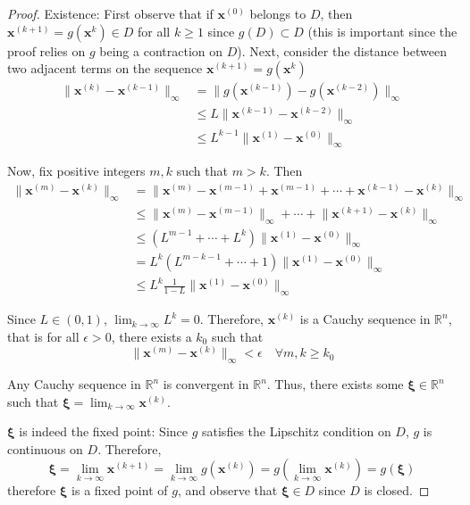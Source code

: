 \documentclass[12pt]{article}
\theoremstyle{definition}
\newcommand{\e}{\epsilon}
\newcommand{\R}{\mathbb{R}}
\newcommand{\norm}[1]{\lVert#1\rVert}
\newcommand{\x}{\bm{x}}
\newcommand{\xib}{\bm{\xi}}
\theoremstyle{definition}
\begin{document}
\begin{proof}
Existence: First observe that if $\x^{(0)}$ belongs to $D$, then $\x^{(k+1)} = g(\x^{k}) \in D$ for all $k \geq 1$ since $g(D) \subset D$ (this is important since the proof relies on $g$ being a contraction on $D$). Next, consider the distance between two adjacent terms on the sequence $\x^{(k+1)} = g(\x^{k})$
\begin{align*}
	\norm{\x^{(k)} - \x^{(k-1)}}_\infty &= \norm{g(\x^{(k-1)}) - g(\x^{(k-2)})}_\infty \tag{definition of $g$} \\
	&\leq L \norm{\x^{(k-1)} - \x^{(k-2)}}_\infty \tag{$g$ is a contraction on $D$} \\
	&\leq L^{k-1} \norm{\x^{(1)} - \x^{(0)}}_\infty \tag{induction}
\end{align*}

Now, fix positive integers $m,k$ such that $m > k$. Then
\begin{align*}
	\norm{\x^{(m)} - \x^{(k)}}_\infty &= \norm{\x^{(m)} - \x^{(m-1)} + \x^{(m-1)} + \cdots + \x^{(k-1)} - \x^{(k)}}_\infty \\
	&\leq \norm{\x^{(m)} - \x^{(m-1)}}_\infty + \cdots + \norm{\x^{(k+1)} - \x^{(k)}}_\infty \tag{triangle inequality} \\
	&\leq (L^{m-1} + \cdots + L^k) \norm{\x^{(1)} - \x^{(0)}}_\infty \tag{$g$ a contraction} \\
	&= L^k (L^{m-k-1} + \cdots + 1) \norm{\x^{(1)} - \x^{(0)}}_\infty \\
	&\leq L^k \frac{1}{1-L} \norm{\x^{(1)} - \x^{(0)}}_\infty \tag{geometric series}
\end{align*}

Since $L \in (0,1)$, $\lim_{k\to\infty} L^k = 0$. Therefore, $\x^{(k)}$ is a Cauchy sequence in $\R^n$, that is for all $\e > 0$, there exists a $k_0$ such that 
\begin{equation}
	\norm{\x^{(m)} - \x^{(k)}}_\infty < \e \quad \forall m,k \geq k_0
\end{equation}

Any Cauchy sequence in $\R^n$ is convergent in $\R^n$. Thus, there exists some $\xib \in \R^n$ such that $\xib = \lim_{k \to \infty} \x^{(k)}$. 

$\xib$ is indeed the fixed point: Since $g$ satisfies the Lipschitz condition on $D$, $g$ is continuous on $D$. Therefore, 
\begin{equation}
	\xib = \lim_{k \to \infty} \x^{(k+1)} = \lim_{k \to \infty} g(\x^{(k)}) = g \left( \lim_{k \to \infty} \x^{(k)} \right) = g(\xib)
\end{equation}
therefore $\xib$ is a fixed point of $g$, and observe that $\xib \in D$ since $D$ is closed. 
\end{proof}
\end{document}
